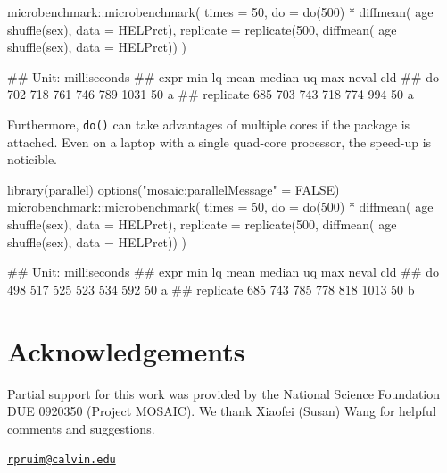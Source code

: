 \begin{Schunk}
\begin{Sinput}
microbenchmark::microbenchmark( times = 50,
  do = do(500) * diffmean( age ~ shuffle(sex), data = HELPrct),
  replicate = replicate(500, diffmean( age ~ shuffle(sex), data = HELPrct))
)
\end{Sinput}
\begin{Soutput}
## Unit: milliseconds
##       expr min  lq mean median  uq  max neval cld
##         do 702 718  761    746 789 1031    50   a
##  replicate 685 703  743    718 774  994    50   a
\end{Soutput}
\end{Schunk}

\noindent
Furthermore, \texttt{do()} can take advantages of multiple cores if the
 package is attached. Even on a laptop with a single
quad-core processor, the speed-up is noticible.

\begin{Schunk}
\begin{Sinput}
library(parallel)
options("mosaic:parallelMessage" = FALSE)
microbenchmark::microbenchmark( times = 50,
  do = do(500) * diffmean( age ~ shuffle(sex), data = HELPrct),
  replicate = replicate(500, diffmean( age ~ shuffle(sex), data = HELPrct))
)
\end{Sinput}
\begin{Soutput}
## Unit: milliseconds
##       expr min  lq mean median  uq  max neval cld
##         do 498 517  525    523 534  592    50  a 
##  replicate 685 743  785    778 818 1013    50   b
\end{Soutput}
\end{Schunk}

\section{Acknowledgements}\label{acknowledgements}

Partial support for this work was provided by the National Science
Foundation DUE 0920350 (Project MOSAIC). We thank Xiaofei (Susan) Wang
for helpful comments and suggestions.



\address{%
Randall Pruim\\
Calvin College\\
Department of Mathematics and Statistics\\ 3201 Burton St SE\\ Grand Rapids, MI 49546\\
}
\href{mailto:rpruim@calvin.edu}{\nolinkurl{rpruim@calvin.edu}}

